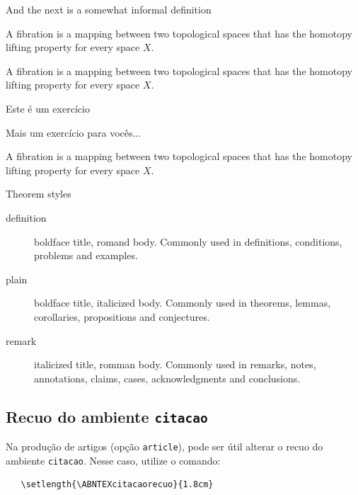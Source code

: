\documentclass[
	article,			%
	12pt,				%
	twoside,			%
	a4paper,			%
	english,			%
	brazil,				%
	sumario=tradicional
	]{abntex2-modelo-notas-de-aula}
\begin{document}
And the next is a somewhat informal definition


\begin{definicao}[Fibration]
	A fibration is a mapping between two topological spaces that has the homotopy lifting property for every space $X$.
\end{definicao}

\begin{exemplo}[Fibration]
	A fibration is a mapping between two topological spaces that has the homotopy lifting property for every space $X$.
\end{exemplo}


\begin{exercicio}
	Este é um exercício
	
\end{exercicio}

\begin{exercicio}
	Mais um exercício para vocês...
	
\end{exercicio}


\begin{condicao}[Fibration]
	A fibration is a mapping between two topological spaces that has the homotopy lifting property for every space $X$.
\end{condicao}
Theorem styles

\begin{description}
	\item[definition] boldface title, romand body. Commonly used in definitions, conditions, problems and examples.
	\item[plain] boldface title, italicized body. Commonly used in theorems, lemmas, corollaries, propositions and conjectures.
	\item[remark] italicized title, romman body. Commonly used in remarks, notes, annotations, claims, cases, acknowledgments and conclusions. 
\end{description}



\subsection{Recuo do ambiente \texttt{citacao}}

Na produção de artigos (opção \texttt{article}), pode ser útil alterar o recuo
do ambiente \texttt{citacao}. Nesse caso, utilize o comando:

\begin{verbatim}
   \setlength{\ABNTEXcitacaorecuo}{1.8cm}
\end{verbatim}
\end{document}
